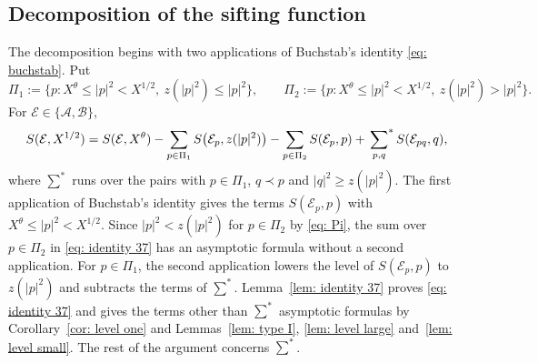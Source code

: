 \documentclass{article}
\numberwithin{equation}{section}
\newcommand{\Le}{\leqslant}
\newcommand{\Ge}{\geqslant}
\begin{document}
\subsection{Decomposition of the sifting function}
\label{subsec: decomposition}

The decomposition begins with two applications of Buchstab's identity \eqref{eq: buchstab}. Put
\begin{equation}
\label{eq: Pi}
\Pi_1 := \bigl\{ p : X^{\theta} \Le |p|^2 < X^{1/2},\ z(|p|^2) \Le |p|^2 \bigr\}, \qquad \Pi_2 := \bigl\{ p : X^{\theta} \Le |p|^2 < X^{1/2},\ z(|p|^2) > |p|^2 \bigr\}.
\end{equation}
For $\mathcal{E} \in \{\mathcal{A}, \mathcal{B}\}$,
\begin{equation}
\label{eq: identity 37}
S(\mathcal{E}, X^{1/2}) = S(\mathcal{E}, X^{\theta}) - \sum_{p \in \Pi_1} S\bigl(\mathcal{E}_p, z(|p|^2)\bigr) - \sum_{p \in \Pi_2} S(\mathcal{E}_p, p) + \sideset{}{^*}\sum_{p, q} S(\mathcal{E}_{pq}, q),
\end{equation}
where $\sum^*$ runs over the pairs with $p \in \Pi_1$, $q \prec p$ and $|q|^2 \Ge z(|p|^2)$. The first application of Buchstab's identity gives the terms $S(\mathcal{E}_p, p)$ with $X^{\theta} \Le |p|^2 < X^{1/2}$. Since $|p|^2 < z(|p|^2)$ for $p \in \Pi_2$ by \eqref{eq: Pi}, the sum over $p \in \Pi_2$ in \eqref{eq: identity 37} has an asymptotic formula without a second application. For $p \in \Pi_1$, the second application lowers the level of $S(\mathcal{E}_p, p)$ to $z(|p|^2)$ and subtracts the terms of $\sum^*$. Lemma~\ref{lem: identity 37} proves \eqref{eq: identity 37} and gives the terms other than $\sum^*$ asymptotic formulas by Corollary~\ref{cor: level one} and Lemmas~\ref{lem: type I}, \ref{lem: level large} and~\ref{lem: level small}. The rest of the argument concerns $\sum^*$.
\end{document}
